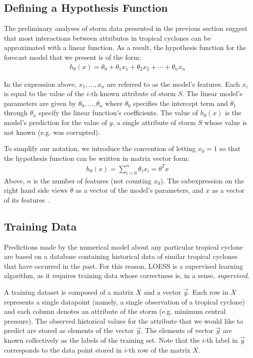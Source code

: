 \documentclass[letterpaper,twocolumn,10pt]{article}
\begin{document}
\subsection{Defining a Hypothesis Function}
The preliminary analyses of storm data presented in the previous section
suggest that most interactions between attributes in tropical cyclones can be
approximated with a linear function. As a result, the hypothesis function for
the forecast model that we present is of the form:
\begin{align}
  h_{\theta}(x) = \theta_0 + \theta_1 x_1 + \theta_2 x_2 + \cdots + \theta_n x_n
\end{align}

In the expression above, $x_1,\ldots,x_n$ are referred to as the model's
features. Each $x_i$ is equal to the value of the \mbox{$i$-th} known attribute
of storm $S$. The linear model's parameters are given by
$\theta_0,\ldots,\theta_n$ where $\theta_0$ specifies the intercept term and
$\theta_1$ through $\theta_n$ specify the linear function's coefficients. The
value of $h_\theta(x)$ is the model's prediction for the value of $y$, a single
attribute of storm $S$ whose value is not known (e.g. was corrupted).

To simplify our notation, we introduce the convention of letting $x_0 = 1$ so
that the hypothesis function can be written in matrix vector form:
\begin{align}
  h_\theta(x) = \sum_{i=0}^{n}{\theta_i x_i} = \theta^T x
\end{align}
Above, $n$ is the number of features (not counting $x_0$). The subexpression
on the right hand side views $\theta$ as a vector of the model's parameters,
and $x$ as a vector of its features~\cite{LinearRegression}.


\subsection{Training Data}
Predictions made by the numerical model about any particular tropical cyclone
are based on a database containing historical data of similar tropical cyclones
that have occurred in the past. For this reason, LOESS is a supervised learning
algorithm, as it requires training data whose correctness is, in a sense,
\emph{supervised}.

A training dataset is composed of a matrix $X$ and a vector $\vec{y}$. Each
row in $X$ represents a single datapoint (namely, a single observation of a
tropical cyclone) and each column denotes an attribute of the storm (e.g.
minimum central pressure). The observed historical values for the attribute
that we would like to predict are stored as elements of the vector $\vec{y}$.
The elements of vector $\vec{y}$ are known collectively as the labels of the
training set. Note that the \mbox{$i$-th} label in $\vec{y}$ corresponds to
the data point stored in $i$-th row of the matrix $X$.
\end{document}
